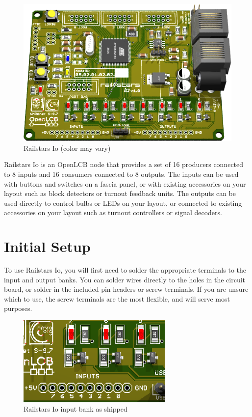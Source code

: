 \documentclass[12pt]{book}
\begin{document}
\begin{figure}[htbp]
\begin{center}
\includegraphics[width=6in]{images/RailstarsIo.png}
\caption{Railstars Io (color may vary)}
\label{Io}
\end{center}
\end{figure}


Railstars Io is an OpenLCB node that provides a set of 16 producers connected to 8 inputs and 16 consumers connected to 8 outputs. The inputs can be used with buttons and switches on a fascia panel, or with existing accessories on your layout such as block detectors or turnout feedback units. The outputs can be used directly to control bulbs or LEDs on your layout, or connected to existing accessories on your layout such as turnout controllers or signal decoders.

\section{Initial Setup}

To use Railstars Io, you will first need to solder the appropriate terminals to the input and output banks. You can solder wires directly to the holes in the circuit board, or solder in the included pin headers or screw terminals. If you are unsure which to use, the screw terminals are the most flexible, and will serve most purposes.

\begin{figure}[htbp]
\begin{center}
\includegraphics[width=3in]{images/IoInputEmpty.png}
\caption{Railstars Io input bank as shipped}
\label{bareinput}
\end{center}
\end{figure}
\end{document}
